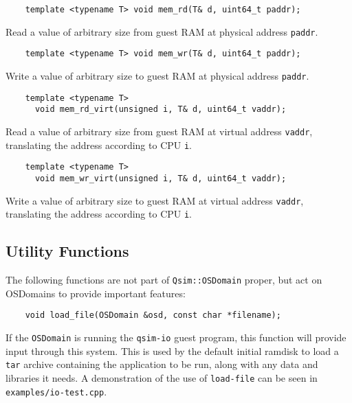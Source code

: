 \documentclass[letterpaper, 10pt]{book}
\begin{document}
\label{tf:mem_rd} \begin{verbatim}
    template <typename T> void mem_rd(T& d, uint64_t paddr);
\end{verbatim}
Read a value of arbitrary size from guest RAM at physical address 
\texttt{paddr}.

\label{tf:mem_wr} \begin{verbatim}
    template <typename T> void mem_wr(T& d, uint64_t paddr);
\end{verbatim}
Write a value of arbitrary size to guest RAM at physical address
\texttt{paddr}.

\label{tf:mem_rd_virt} \begin{verbatim}
    template <typename T> 
      void mem_rd_virt(unsigned i, T& d, uint64_t vaddr);
\end{verbatim}
Read a value of arbitrary size from guest RAM at virtual address
\texttt{vaddr}, translating the address according to CPU \texttt{i}.

\label{tf:mem_wr_virt} \begin{verbatim}
    template <typename T> 
      void mem_wr_virt(unsigned i, T& d, uint64_t vaddr);
\end{verbatim}

Write a value of arbitrary size to guest RAM at virtual address
\texttt{vaddr}, translating the address according to CPU \texttt{i}.

\subsection{Utility Functions}

The following functions are not part of \texttt{Qsim::OSDomain} proper, but act on OSDomains to provide important features:

\label{func:load_file} \begin{verbatim}
    void load_file(OSDomain &osd, const char *filename);
\end{verbatim}

If the \texttt{OSDomain} is running the \texttt{qsim-io} guest program, this
function will provide input through this system. This is used by the default
initial ramdisk to load a \texttt{tar} archive containing the application to be
run, along with any data and libraries it needs. A demonstration of the use of
\texttt{load-file} can be seen in \texttt{examples/io-test.cpp}.
\newpage
\end{document}
